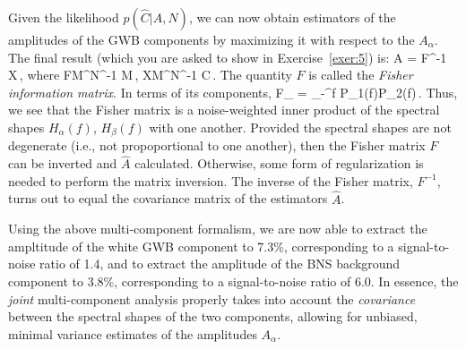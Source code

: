 Given the likelihood $p(\hat C|A,N)$, we can now obtain 
estimators of the amplitudes of the GWB components
by maximizing it with respect to the $A_\alpha$.
The final result (which you are asked to show in 
Exercise~\ref{exer:5}) is: 
%
\be
\hat A = F^{-1} X\,,
\ee
%
where
%
\be
F\equiv M^\dagger N^{-1} M\,,
\qquad 
X\equiv M^\dagger N^{-1} \hat C\,.
\ee
%
The quantity $F$ is called the 
{\em Fisher information matrix}.
In terms of its components,
%
\be
F_{\alpha\beta} = \int_{-\infty}^\infty \D f\> 
{P_1(f)P_2(f)}\,.
\ee
%
Thus, we see that the Fisher matrix is a noise-weighted 
inner product 
of the spectral shapes $H_\alpha(f)$, $H_\beta(f)$ with one 
another.
Provided the spectral shapes are not degenerate (i.e., not 
propoportional to one another), then the Fisher matrix $F$
can be inverted and $\hat A$ calculated.
Otherwise, some form of regularization is needed to 
perform the matrix inversion.
The inverse of the Fisher matrix, $F^{-1}$, turns out to
equal the covariance matrix of the estimators $\hat A$.  

Using the above multi-component formalism, we are now able 
to extract the ampltitude of the white GWB component to 7.3\%, 
corresponding to a signal-to-noise ratio of 1.4, 
and to extract
the amplitude of the BNS background component to 3.8\%,
corresponding to a signal-to-noise ratio of 6.0.
In essence, the {\em joint} multi-component analysis 
properly takes into account the {\em covariance}
between the spectral shapes of the two components, 
allowing for unbiased, minimal variance estimates of 
the amplitudes $A_\alpha$.

